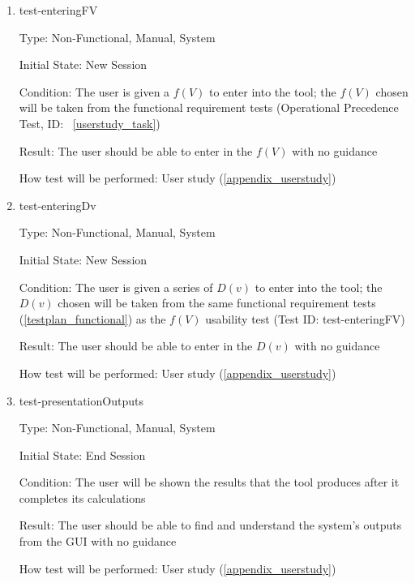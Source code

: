 \documentclass[12pt, titlepage]{article}
\begin{document}
\begin{enumerate}

\item{test-enteringFV}

Type: Non-Functional, Manual, System
					
Initial State: New Session
					
Condition: The user is given a $f(V)$ to enter into the tool; the 
$f(V)$ chosen will be taken from the functional requirement tests 
(Operational Precedence Test, ID: ~\ref{userstudy_task})
					
Result: The user should be able to enter in the $f(V)$ with no guidance
					
How test will be performed: User study (\ref{appendix_userstudy})\\
					
\item{test-enteringDv}

Type: Non-Functional, Manual, System
					
Initial State: New Session
					
Condition: The user is given a series of $D(v)$ to enter into the tool; the 
$D(v)$ chosen will be taken from the same functional requirement tests 
(\ref{testplan_functional}) as the $f(V)$ usability test (Test ID: 
test-enteringFV)
					
Result: The user should be able to enter in the $D(v)$ with no guidance
					
How test will be performed: User study (\ref{appendix_userstudy})\\

\item{test-presentationOutputs}

Type: Non-Functional, Manual, System

Initial State: End Session

Condition: The user will be shown the results that the tool produces after it 
completes its calculations

Result: The user should be able to find and understand the system's outputs 
from the GUI with no guidance

How test will be performed: User study (\ref{appendix_userstudy})\\

\end{enumerate}
\end{document}
